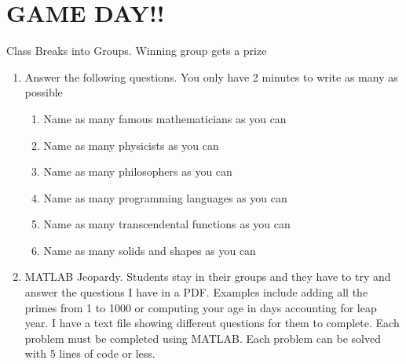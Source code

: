 \section{GAME DAY!!}

Class Breaks into Groups. Winning group gets a prize

\begin{enumerate}

\item Answer the following questions. You only have 2 minutes to write as
many as possible

\begin{enumerate} 
  \item Name as many famous mathematicians as you can
  \item Name as many physicists as you can
  \item Name as many philosophers as you can
  \item Name as many programming languages as you can
  \item Name as many transcendental functions as you can
  \item Name as many solids and shapes as you can
\end{enumerate}

\item MATLAB Jeopardy. Students stay in their groups and they have to try
  and answer the questions I have in a PDF. Examples
  include adding all the primes from 1 to 1000 or computing your age
  in days accounting for leap year. I have a text file showing
  different questions for them to complete. Each problem must be
  completed using MATLAB. Each problem can be solved with 5 lines of
  code or less.

\end{enumerate}


